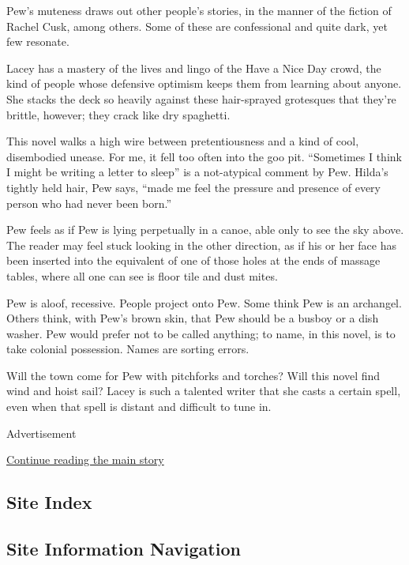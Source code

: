 Pew's muteness draws out other people's stories, in the manner of the
fiction of Rachel Cusk, among others. Some of these are confessional and
quite dark, yet few resonate.

Lacey has a mastery of the lives and lingo of the Have a Nice Day crowd,
the kind of people whose defensive optimism keeps them from learning
about anyone. She stacks the deck so heavily against these hair-sprayed
grotesques that they're brittle, however; they crack like dry spaghetti.

This novel walks a high wire between pretentiousness and a kind of cool,
disembodied unease. For me, it fell too often into the goo pit.
``Sometimes I think I might be writing a letter to sleep'' is a
not-atypical comment by Pew. Hilda's tightly held hair, Pew says, ``made
me feel the pressure and presence of every person who had never been
born.''

Pew feels as if Pew is lying perpetually in a canoe, able only to see
the sky above. The reader may feel stuck looking in the other direction,
as if his or her face has been inserted into the equivalent of one of
those holes at the ends of massage tables, where all one can see is
floor tile and dust mites.

Pew is aloof, recessive. People project onto Pew. Some think Pew is an
archangel. Others think, with Pew's brown skin, that Pew should be a
busboy or a dish washer. Pew would prefer not to be called anything; to
name, in this novel, is to take colonial possession. Names are sorting
errors.

Will the town come for Pew with pitchforks and torches? Will this novel
find wind and hoist sail? Lacey is such a talented writer that she casts
a certain spell, even when that spell is distant and difficult to tune
in.

Advertisement

\protect\hyperlink{after-bottom}{Continue reading the main story}

\hypertarget{site-index}{%
\subsection{Site Index}\label{site-index}}

\hypertarget{site-information-navigation}{%
\subsection{Site Information
Navigation}\label{site-information-navigation}}

